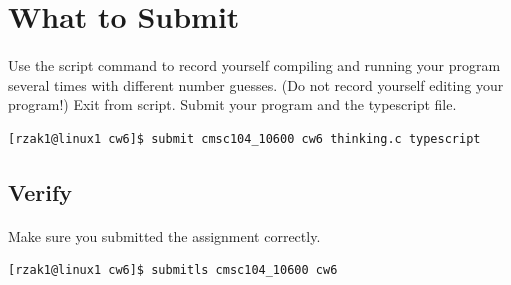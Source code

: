 \documentclass[letter,11pt]{article}
\begin{document}
\section*{What to Submit}
\paragraph{}Use the script command to record yourself compiling and running your program several times with different number guesses. (Do not record yourself editing your program!) Exit from script. Submit your program and the typescript file.
\begin{verbatim}
[rzak1@linux1 cw6]$ submit cmsc104_10600 cw6 thinking.c typescript
\end{verbatim}

\subsection*{Verify}
\paragraph{}Make sure you submitted the assignment correctly.
\begin{verbatim}
[rzak1@linux1 cw6]$ submitls cmsc104_10600 cw6
\end{verbatim}
\end{document}
